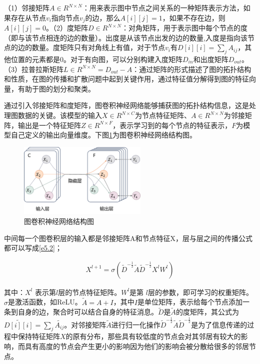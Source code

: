 （1）邻接矩阵$A \in R^{N×N}$：用来表示图中节点之间关系的一种矩阵表示方法，如果存在从节点$v_i$指向节点$v_j$的边，那么$A[i][j] = 1$，如果不存在边，则$A[i][j] = 0$。（2）度矩阵$D \in R^{N×N}$：对角矩阵，用于表示图中每个节点的度（即与该节点相连的边的数量）。出度是从该节点出发的边的数量,入度是指向该节点的边的数量。度矩阵只有对角线上有值，对于节点$v_i$有$D[i][i] = \sum_j A_{ij}$，其他位置的元素都是0。对于有向图，可以分别构建入度矩阵$D_{in}$和出度矩阵$D_{out}$。（3）拉普拉斯矩阵$L \in R^{N×N} = D_{out} - A$：通过矩阵的形式描述了图的拓扑结构和性质，在图的传播和扩散问题中起到关键作用，通过特征值分解得到图的特征向量，有助于图的划分和聚类。

通过引入邻接矩阵和度矩阵，图卷积神经网络能够捕获图的拓扑结构信息，这是处理图数据的关键。该模型的输入$X \in R^{N×C}$为节点特征矩阵、$A \in R^{N×N}$为邻接矩阵，输出是一个特征矩阵$Z \in R^{N×F}$，表示学习到的每个节点的特征表示，$F$为模型自己定义的输出向量维度。下图\ref{fig:gcn}为图卷积神经网络结构图。
\begin{figure}[H]
  \centering
  \includegraphics[width=0.55\textwidth]{figures/gcn.png}
  \caption{图卷积神经网络结构图}\label{fig:gcn}
\end{figure}

中间每一个图卷积层的输入都是邻接矩阵A和节点特征X，层与层之间的传播公式都可以写成\ref{e5.2}；

\begin{equation}\label{e5.2}
  \begin{split}
    X^{l+1} = \sigma(\tilde{D}^{-\frac{1}{2}}\tilde{A}\tilde{D}^{-\frac{1}{2}}X^{l}W^{l})
  \end{split}
\end{equation}

其中：$X^{l}$ 表示第$l$层的节点特征矩阵。$W^{l}$是第 $l$层的参数，即可学习的权重矩阵。$\sigma$是激活函数，如ReLU。$\tilde{A} = A + I$，其中$I$是单位矩阵，表示给每个节点添加一条到自身的边，聚合时可以结合自身的特征消息。$\tilde{D}$是$\tilde{A}$的度矩阵，其公式为$\tilde{D[i][i]} = \sum_j \tilde{A_{ij}}$。对邻接矩阵$\tilde{A}$进行归一化操作$\tilde{D}^{-\frac{1}{2}}\tilde{A}\tilde{D}^{-\frac{1}{2}}$是为了信息传递的过程中保持特征矩阵$X$的原有分布，那些具有较低度的节点会对其邻居有较大的影响，而具有高度的节点会产生更小的影响因为他们的影响会被分散给很多的邻居节点。

